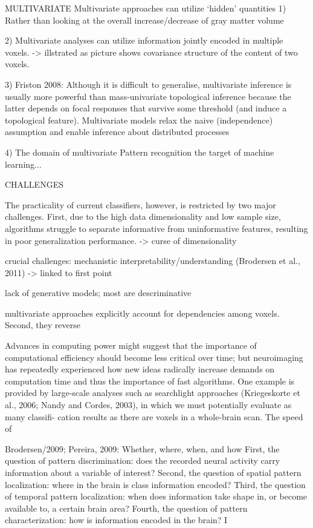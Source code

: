 \documentclass[authoryear,review,3p]{elsarticle}
\begin{document}
MULTIVARIATE
Multivariate approaches can utilize ‘hidden’ quantities 
1) Rather than looking at the overall increase/decrease of gray matter volume

2) Multivariate analyses can utilize information jointly encoded in multiple voxels. -> illstrated as picture shows covariance structure of the content of two voxels.

3) Friston 2008: Although it is difficult to generalise, multivariate inference is usually more powerful than mass-univariate topological inference because the latter depends on focal responses that survive some threshold (and induce a topological feature). Multivariate models relax the naive (independence) assumption and enable inference about distributed processes

4) The domain of multivariate Pattern recognition the target of machine learning...


CHALLENGES

The practicality of current classifiers, however, is restricted by two major challenges. First, due to the high data dimensionality and low sample size, algorithms struggle to separate informative from uninformative features, resulting in poor generalization performance. -> curse of dimensionality

crucial challenges: mechanistic interpretability/understanding
(Brodersen et al., 2011) -> linked to first point

lack of generative models; most are descriminative


multivariate approaches explicitly account for dependencies among voxels. Second, they reverse

Advances in computing power might suggest that the importance of computational efficiency should become less critical over time; but neuroimaging has repeatedly experienced how new ideas radically increase demands on computation time and thus the importance of fast algorithms. One example is provided by large-scale analyses such as searchlight approaches (Kriegeskorte et al., 2006; Nandy and Cordes, 2003), in which we must potentially evaluate as many classifi- cation results as there are voxels in a whole-brain scan. The speed of


Brodersen/2009; Pereira, 2009:
Whether, where, when, and how
First, the question of pattern discrimination: does the recorded neural activity carry information about a variable of interest? 
Second, the question of spatial pattern localization: where in the brain is class information encoded? 
Third, the question of temporal pattern localization:
when does information take shape in, or become available to, a certain brain area? 
Fourth, the question of pattern characterization: how is information encoded in the brain? I
\end{document}
